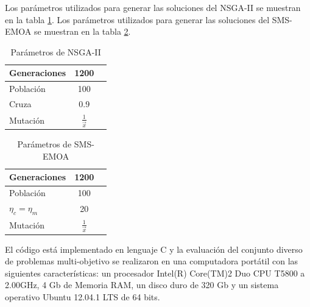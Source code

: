 Los par\'ametros utilizados para generar las soluciones del NSGA-II se muestran en la tabla \ref{tab:parametros2}. Los par\'ametros
utilizados para generar las soluciones del SMS-EMOA se muestran en la tabla \ref{tab:parametros3}.

\begin{minipage}{0.5\textwidth}
\begin{table}[H]
  \begin{center}
    \begin{tabular}{|l||c|c}
	\hline
	Generaciones  & 1200 \\ 
	\hline
	Poblaci\'on & 100 \\ 
	\hline
	Cruza & 0.9 \\
	\hline
	Mutaci\'on & $\frac{1}{\vec{x}}$ \\
	\hline
  \end{tabular}
  \caption{Par\'ametros de NSGA-II}
  \label{tab:parametros2}
\end{center}
\end{table}
\end{minipage}
\begin{minipage}{0.5\textwidth}
\begin{table}[H]
	\begin{center}
		\begin{tabular}{|l||c|c}
			\hline
			Generaciones  & 1200 \\ 
			\hline
			Poblaci\'on & 100 \\ 
			\hline
			$\eta_c = \eta_m$ & 20 \\ 
			\hline
			Mutaci\'on & $\frac{1}{\vec{x}}$\\ 
			\hline			
		\end{tabular}
		\caption{Par\'ametros de SMS-EMOA}
		\label{tab:parametros3}
	\end{center}
\end{table}
\end{minipage}

El c\'odigo est\'a implementado en lenguaje C y la evaluaci\'on del conjunto diverso de problemas multi-objetivo se realizaron en una 
computadora port\'atil con las siguientes caracter\'isticas: un procesador Intel(R) Core(TM)2 Duo CPU T5800 a 2.00GHz, 4 Gb de Memoria RAM, 
un disco duro de 320 Gb y un sistema operativo Ubuntu 12.04.1 LTS de 64 bits.

